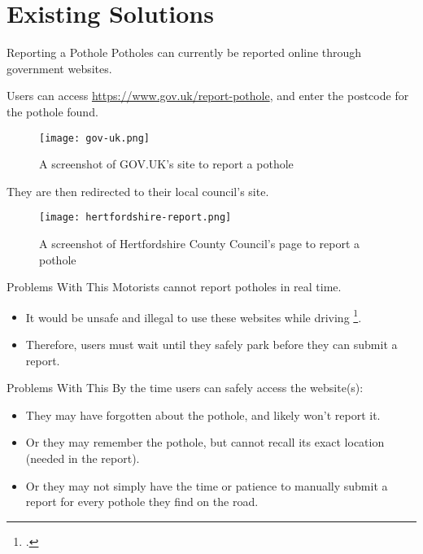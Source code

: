 \documentclass{beamer}
\begin{document}
\section{Existing Solutions}

\begin{frame}{Reporting a Pothole}
    Potholes can currently be reported online through government websites.
\end{frame}

\begin{frame}
    Users can access \url{https://www.gov.uk/report-pothole}, and enter the postcode for the pothole found.
    \begin{figure}
        \texttt{[image: gov-uk.png]}
        \caption{A screenshot of GOV.UK's site to report a pothole}
    \end{figure}
\end{frame}

\begin{frame}
    They are then redirected to their local council's site.
    \begin{figure}
        \texttt{[image: hertfordshire-report.png]}
        \caption{A screenshot of Hertfordshire County Council's page to report a pothole}
    \end{figure}
\end{frame}

\begin{frame}{Problems With This}
    Motorists cannot report potholes in real time.
    \begin{itemize}
        \item It would be unsafe and illegal to use these websites while driving \footcite{highway-code}.
        \item Therefore, users must wait until they safely park before they can submit a report.
    \end{itemize}
\end{frame}

\begin{frame}{Problems With This}
    By the time users can safely access the website(s):
    \begin{itemize}
        \item They may have forgotten about the pothole, and likely won't report it.
        \item Or they may remember the pothole, but cannot recall its exact location (needed in the report).
        \item Or they may not simply have the time or patience to manually submit a report for every pothole they find on the road.
    \end{itemize}
\end{frame}
\end{document}
